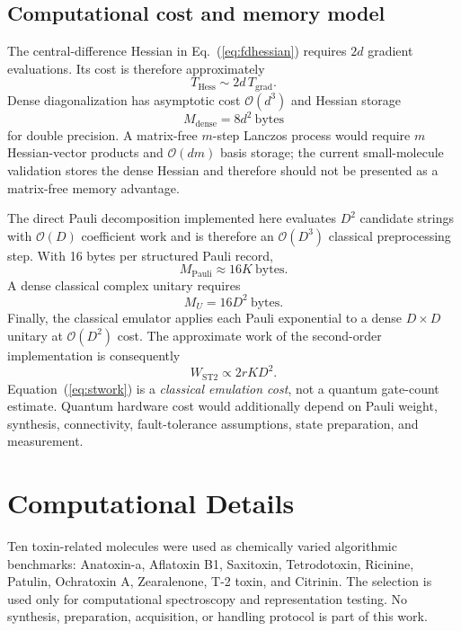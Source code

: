 \documentclass[aip,jcp,reprint,amsmath,amssymb,floatfix]{revtex4-2}
\begin{document}
\subsection{Computational cost and memory model}
The central-difference Hessian in Eq.~(\ref{eq:fdhessian}) requires $2d$ gradient evaluations. Its cost is therefore approximately
\begin{equation}
T_{\mathrm{Hess}}\sim 2d\,T_{\mathrm{grad}}.
\end{equation}
Dense diagonalization has asymptotic cost $\mathcal{O}(d^3)$ and Hessian storage
\begin{equation}
M_{\mathrm{dense}}=8d^2\ \mathrm{bytes}
\label{eq:densemem}
\end{equation}
for double precision. A matrix-free $m$-step Lanczos process would require $m$ Hessian-vector products and $\mathcal{O}(dm)$ basis storage; the current small-molecule validation stores the dense Hessian and therefore should not be presented as a matrix-free memory advantage.

The direct Pauli decomposition implemented here evaluates $D^2$ candidate strings with $\mathcal{O}(D)$ coefficient work and is therefore an $\mathcal{O}(D^3)$ classical preprocessing step. With 16 bytes per structured Pauli record,
\begin{equation}
M_{\mathrm{Pauli}}\approx 16K\ \mathrm{bytes}.
\label{eq:paulimem}
\end{equation}
A dense classical complex unitary requires
\begin{equation}
M_U=16D^2\ \mathrm{bytes}.
\label{eq:unitarymem}
\end{equation}
Finally, the classical emulator applies each Pauli exponential to a dense $D\times D$ unitary at $\mathcal{O}(D^2)$ cost. The approximate work of the second-order implementation is consequently
\begin{equation}
W_{\mathrm{ST2}}\propto 2rKD^2.
\label{eq:stwork}
\end{equation}
Equation~(\ref{eq:stwork}) is a \emph{classical emulation cost}, not a quantum gate-count estimate. Quantum hardware cost would additionally depend on Pauli weight, synthesis, connectivity, fault-tolerance assumptions, state preparation, and measurement.\cite{Trenev2025Resource,Malpathak2026Trotter}

\section{Computational Details}
Ten toxin-related molecules were used as chemically varied algorithmic benchmarks: Anatoxin-a, Aflatoxin B1, Saxitoxin, Tetrodotoxin, Ricinine, Patulin, Ochratoxin A, Zearalenone, T-2 toxin, and Citrinin. The selection is used only for computational spectroscopy and representation testing. No synthesis, preparation, acquisition, or handling protocol is part of this work.
\end{document}
